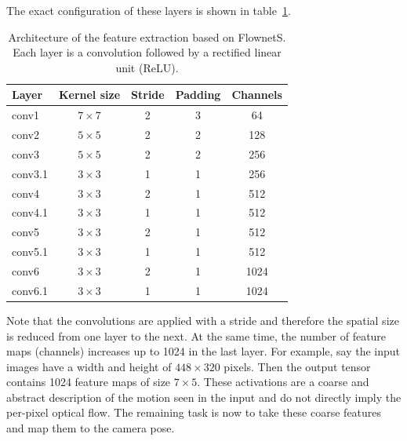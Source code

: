			The exact configuration of these layers is shown in table~\ref{tbl:first_part_of_flownets}.
			\begin{table}[tb]
				\small
				\begin{center}
					\begin{tabular}{|l|c|c|c|c|}
						\hline
						Layer 		& Kernel size 		& Stride 		& Padding 		& Channels 		\\ \hline
						conv1 		& $7 \times 7$		& 2 			& 3 			& 64 			\\ \hline
						conv2 		& $5 \times 5$		& 2 			& 2 			& 128 			\\ \hline
						conv3 		& $5 \times 5$		& 2 			& 2 			& 256			\\ \hline
						conv3.1 	& $3 \times 3$		& 1 			& 1 			& 256 			\\ \hline
						conv4 		& $3 \times 3$		& 2 			& 1 			& 512 			\\ \hline
						conv4.1 	& $3 \times 3$		& 1 			& 1 			& 512 			\\ \hline
						conv5 		& $3 \times 3$		& 2 			& 1 			& 512 			\\ \hline
						conv5.1 	& $3 \times 3$		& 1 			& 1 			& 512 			\\ \hline
						conv6 		& $3 \times 3$		& 2 			& 1 			& 1024 			\\ \hline
						conv6.1 	& $3 \times 3$		& 1 			& 1 			& 1024 			\\ \hline
					\end{tabular}
				\end{center}
				\caption[Architecture of the feature extraction based on FlownetS]
						{Architecture of the feature extraction based on FlownetS. 
						 Each layer is a convolution followed by a rectified linear unit (ReLU).
						 \label{tbl:first_part_of_flownets}}
			\end{table}
			Note that the convolutions are applied with a stride and therefore the spatial size is reduced from one layer to the next.
			At the same time, the number of feature maps (channels) increases up to 1024 in the last layer.
			For example, say the input images have a width and height of $448 \times 320$ pixels. 
			Then the output tensor contains 1024 feature maps of size $7 \times 5$.
			These activations are a coarse and abstract description of the motion seen in the input and do not directly imply the per-pixel optical flow.
			The remaining task is now to take these coarse features and map them to the camera pose. 
			
